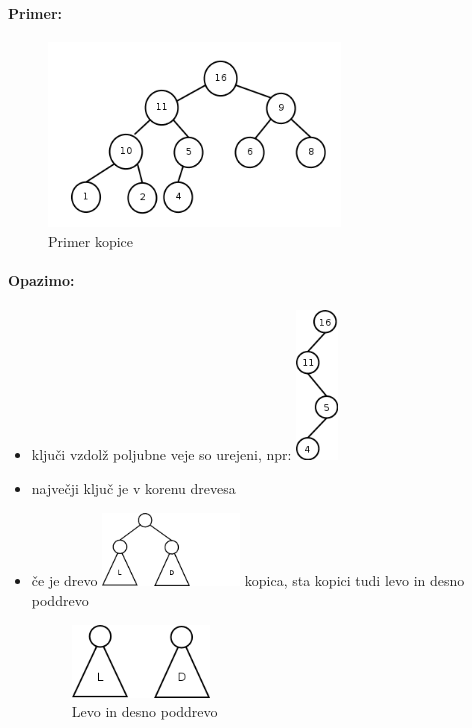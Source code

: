 \documentclass[a4paper,10pt]{article}
\begin{document}
\paragraph{Primer:}
\begin{figure}[hbt]
	\centering
	\includegraphics[width=7.75cm,height=4.9cm]{Slike/KopicaPrimer.png}
	\caption{Primer kopice}
\end{figure}

\paragraph{Opazimo:}
\begin{itemize}
\item klju\v ci vzdol\v z poljubne veje so urejeni, npr:
	\includegraphics[width=1.1cm,height=4cm]{Slike/KopicaVeja.png}
\item najve\v cji klju\v c je v korenu drevesa
\item \v ce je drevo 
	\includegraphics[width=3.65cm,height=1.95cm]{Slike/KopicaSPoddrevesi.png}
	kopica, sta kopici tudi levo in desno poddrevo
	\begin{figure}[hbt]
		\centering
		\includegraphics[width=3.65cm,height=1.95cm]{Slike/LevoInDesnoPoddrevo.png}
		\caption{Levo in desno poddrevo}
	\end{figure}
\end{itemize}
\end{document}
